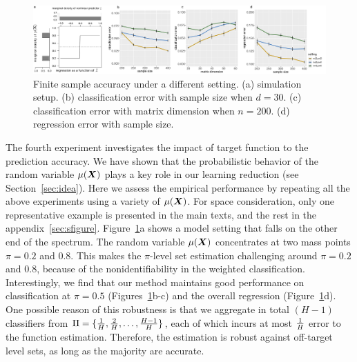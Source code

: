 \documentclass[11pt]{article}
\theoremstyle{plain}
\theoremstyle{definition}
\begin{document}
\begin{figure}[ht]
    \centering
    \includegraphics[width=\textwidth]{combined_steps.pdf}
    \caption{Finite sample accuracy under a different setting. (a) simulation setup. (b) classification error with sample size when $d=30$. (c) classification error with matrix dimension when $n=200$. (d) regression error with sample size. }\label{fig:step}
\end{figure}

The fourth experiment investigates the impact of target function to the prediction accuracy. We have shown that the probabilistic behavior of the random variable $\mu(\bm X)$ plays a key role in our learning reduction (see Section~\ref{sec:idea}). Here we assess the empirical performance by repeating all the above experiments using a variety of $\mu(\bm X)$. For space consideration, only one representative example is presented in the main texts, and the rest in the appendix~\ref{sec:sfigure}. Figure~\ref{fig:step}a shows a model setting that falls on the other end of the spectrum. The random variable $\mu(\bm X)$ concentrates at two mass points $\pi=0.2$ and $0.8$. This makes the $\pi$-level set estimation challenging around $\pi=0.2$ and $0.8$, because of the nonidentifiability in the weighted classification. Interestingly, we find that our method maintains good performance on classification at $\pi=0.5$ (Figures~\ref{fig:step}b-c) and the overall regression (Figure~\ref{fig:step}d). One possible reason of this robustness is that we aggregate in total $(H-1)$ classifiers from $\Pi=\{{1\over H}, {2\over H},\ldots,{H-1\over H}\}$, each of which incurs at most ${1\over H}$ error to the function estimation. Therefore, the estimation is robust against off-target level sets, as long as the majority are accurate.  
\end{document}

